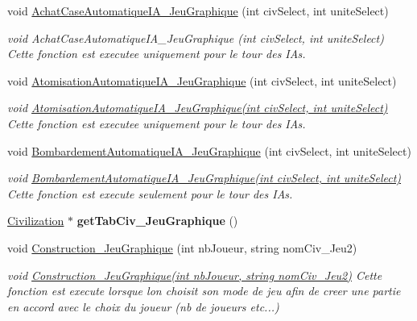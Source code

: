 \begin{DoxyCompactItemize}
void \hyperlink{classJeu__graphique_a3e52d90cbfecc5574d57cf9edd2e6dbe}{Achat\+Case\+Automatique\+I\+A\+\_\+\+Jeu\+Graphique} (int civ\+Select, int unite\+Select)
\begin{DoxyCompactList}\small\item\em void Achat\+Case\+Automatique\+I\+A\+\_\+\+Jeu\+Graphique (int civ\+Select, int unite\+Select) Cette fonction est executee uniquement pour le tour des I\+As. \end{DoxyCompactList}\item 
void \hyperlink{classJeu__graphique_af4ade29c26e98e7bb22ed47577daaba2}{Atomisation\+Automatique\+I\+A\+\_\+\+Jeu\+Graphique} (int civ\+Select, int unite\+Select)
\begin{DoxyCompactList}\small\item\em void \hyperlink{classJeu__graphique_af4ade29c26e98e7bb22ed47577daaba2}{Atomisation\+Automatique\+I\+A\+\_\+\+Jeu\+Graphique(int civ\+Select, int unite\+Select)} Cette fonction est executee uniquement pour le tour des I\+As. \end{DoxyCompactList}\item 
void \hyperlink{classJeu__graphique_ada61d087659270184bc8a1ceac9c78f6}{Bombardement\+Automatique\+I\+A\+\_\+\+Jeu\+Graphique} (int civ\+Select, int unite\+Select)
\begin{DoxyCompactList}\small\item\em void \hyperlink{classJeu__graphique_ada61d087659270184bc8a1ceac9c78f6}{Bombardement\+Automatique\+I\+A\+\_\+\+Jeu\+Graphique(int civ\+Select, int unite\+Select)} Cette fonction est execute seulement pour le tour des I\+As. \end{DoxyCompactList}\item 
\mbox{\label{classJeu__graphique_a39c9560b3ba6d2fc95961de85a4b91d2}} 
\hyperlink{classCivilization}{Civilization} $\ast$ {\bfseries get\+Tab\+Civ\+\_\+\+Jeu\+Graphique} ()
\item 
void \hyperlink{classJeu__graphique_ae57233f761d45a577584fa3dfe1603b3}{Construction\+\_\+\+Jeu\+Graphique} (int nb\+Joueur, string nom\+Civ\+\_\+\+Jeu2)
\begin{DoxyCompactList}\small\item\em void \hyperlink{classJeu__graphique_ae57233f761d45a577584fa3dfe1603b3}{Construction\+\_\+\+Jeu\+Graphique(int nb\+Joueur, string nom\+Civ\+\_\+\+Jeu2)} Cette fonction est execute lorsque l\textquotesingle{}on choisit son mode de jeu afin de creer une partie en accord avec le choix du joueur (nb de joueurs etc...) \end{DoxyCompactList}\item 

\end{DoxyCompactItemize}
